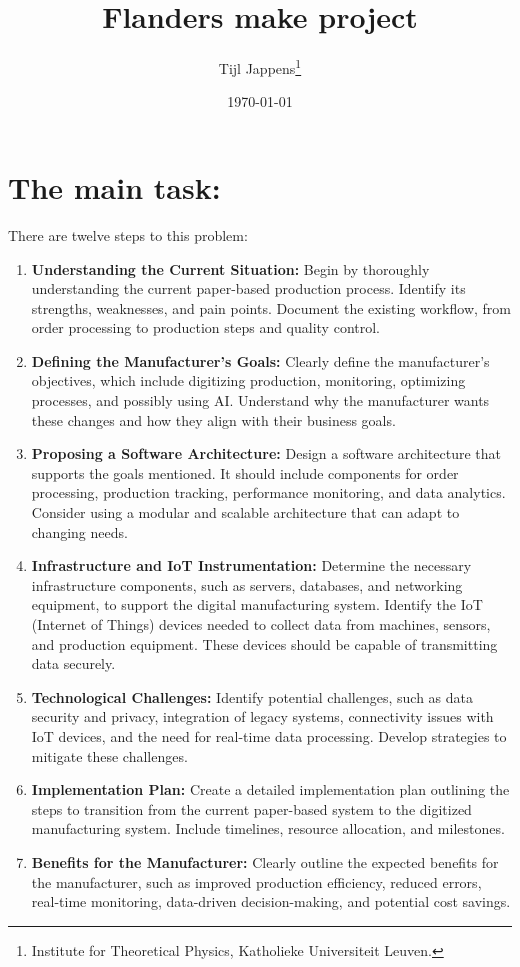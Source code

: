 \documentclass[12pt,a4paper,twoside]{article}
\title{Flanders make project}
\author{Tijl Jappens\footnote{Institute for Theoretical Physics, Katholieke Universiteit Leuven.}}
\date{\today}
\begin{document}
	\section*{The main task:}
	There are twelve steps to this problem:
	\begin{enumerate}
		\item \textbf{Understanding the Current Situation:} Begin by thoroughly understanding the current paper-based production process. Identify its strengths, weaknesses, and pain points.
		Document the existing workflow, from order processing to production steps and quality control.
		
		\item \textbf{Defining the Manufacturer's Goals:} Clearly define the manufacturer's objectives, which include digitizing production, monitoring, optimizing processes, and possibly using AI.
		Understand why the manufacturer wants these changes and how they align with their business goals.
		
		\item \textbf{Proposing a Software Architecture:} Design a software architecture that supports the goals mentioned. It should include components for order processing, production tracking, performance monitoring, and data analytics.
		Consider using a modular and scalable architecture that can adapt to changing needs.
		
		\item \textbf{Infrastructure and IoT Instrumentation:} Determine the necessary infrastructure components, such as servers, databases, and networking equipment, to support the digital manufacturing system. Identify the IoT (Internet of Things) devices needed to collect data from machines, sensors, and production equipment. These devices should be capable of transmitting data securely.
		
		\item \textbf{Technological Challenges:} Identify potential challenges, such as data security and privacy, integration of legacy systems, connectivity issues with IoT devices, and the need for real-time data processing. Develop strategies to mitigate these challenges.
		
		\item \textbf{Implementation Plan:} Create a detailed implementation plan outlining the steps to transition from the current paper-based system to the digitized manufacturing system.
		Include timelines, resource allocation, and milestones.
		
		\item \textbf{Benefits for the Manufacturer:} Clearly outline the expected benefits for the manufacturer, such as improved production efficiency, reduced errors, real-time monitoring, data-driven decision-making, and potential cost savings.
		

\end{enumerate}
\end{document}

